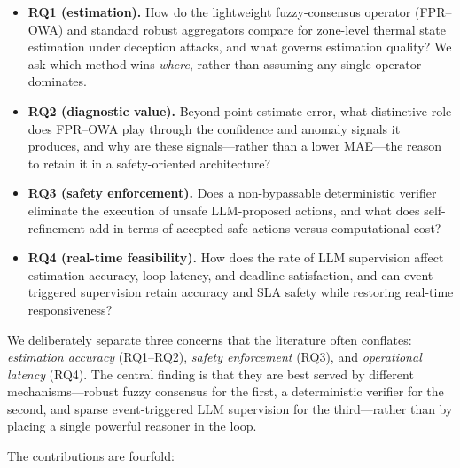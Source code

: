 \documentclass[preprint,11pt]{elsarticle}
\begin{document}
\begin{itemize}
\item \textbf{RQ1 (estimation).} How do the lightweight fuzzy-consensus
operator (FPR--OWA) and standard robust aggregators compare for
zone-level thermal state estimation under deception attacks, and what
governs estimation quality? We ask which method wins \emph{where},
rather than assuming any single operator dominates.
\item \textbf{RQ2 (diagnostic value).} Beyond point-estimate error, what
distinctive role does FPR--OWA play through the confidence and anomaly
signals it produces, and why are these signals---rather than a lower
MAE---the reason to retain it in a safety-oriented architecture?
\item \textbf{RQ3 (safety enforcement).} Does a non-bypassable
deterministic verifier eliminate the execution of unsafe LLM-proposed
actions, and what does self-refinement add in terms of accepted safe
actions versus computational cost?
\item \textbf{RQ4 (real-time feasibility).} How does the rate of LLM
supervision affect estimation accuracy, loop latency, and deadline
satisfaction, and can event-triggered supervision retain accuracy and
SLA safety while restoring real-time responsiveness?
\end{itemize}

We deliberately separate three concerns that the literature often
conflates: \emph{estimation accuracy} (RQ1--RQ2), \emph{safety
enforcement} (RQ3), and \emph{operational latency} (RQ4). The central
finding is that they are best served by different mechanisms---robust
fuzzy consensus for the first, a deterministic verifier for the second,
and sparse event-triggered LLM supervision for the third---rather than
by placing a single powerful reasoner in the loop.

The contributions are fourfold:
\end{document}
